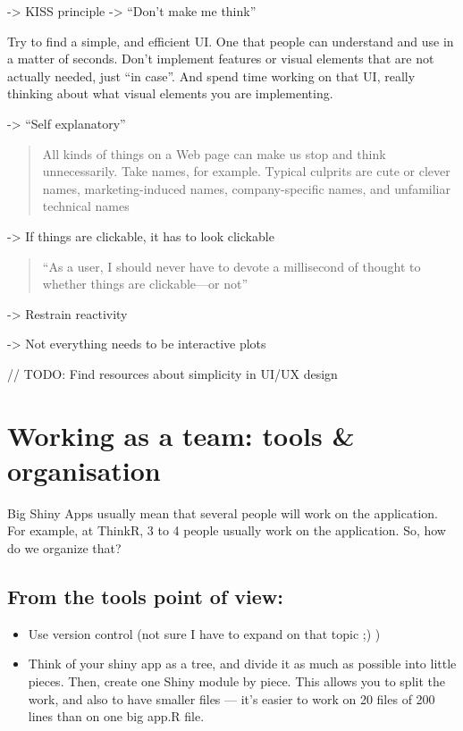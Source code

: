 \documentclass[]{book}
\providecommand{\tightlist}{%
  \setlength{\itemsep}{0pt}\setlength{\parskip}{0pt}}
\begin{document}
-\textgreater{} KISS principle
-\textgreater{} ``Don't make me think''

Try to find a simple, and efficient UI. One that people can understand and use in a matter of seconds. Don't implement features or visual elements that are not actually needed, just ``in case''. And spend time working on that UI, really thinking about what visual elements you are implementing.

-\textgreater{} ``Self explanatory''

\begin{quote}
All kinds of things on a Web page can make us stop and think unnecessarily. Take names, for example. Typical culprits are cute or clever names, marketing-induced names, company-specific names, and unfamiliar technical names
\end{quote}

-\textgreater{} If things are clickable, it has to look clickable

\begin{quote}
``As a user, I should never have to devote a millisecond of thought to whether
things are clickable---or not''
\end{quote}

-\textgreater{} Restrain reactivity

-\textgreater{} Not everything needs to be interactive plots

// TODO: Find resources about simplicity in UI/UX design

\hypertarget{working-as-a-team-tools-organisation}{%
\section{Working as a team: tools \& organisation}\label{working-as-a-team-tools-organisation}}

Big Shiny Apps usually mean that several people will work on the application. For example, at ThinkR, 3 to 4 people usually work on the application. So, how do we organize that?

\hypertarget{from-the-tools-point-of-view}{%
\subsection{From the tools point of view:}\label{from-the-tools-point-of-view}}

\begin{itemize}
\tightlist
\item
  Use version control (not sure I have to expand on that topic ;) )
\item
  Think of your shiny app as a tree, and divide it as much as possible into little pieces. Then, create one Shiny module by piece. This allows you to split the work, and also to have smaller files --- it's easier to work on 20 files of 200 lines than on one big app.R file.
\end{itemize}
\end{document}
